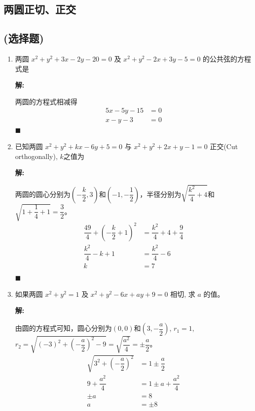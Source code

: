 \documentclass[10pt]{article}
\newcommand{\sol}{\textbf{解:} }
\begin{document}
\subsection{两圆正切、正交}
\subsection*{(选择题)}

\begin{enumerate}[leftmargin=*]
  \item 两圆 $x^{2}+y^{2}+3 x-2 y-20=0$ 及 $x^{2}+y^{2}-2 x+3 y-5=0$ 的公共弦的方程式是

        \sol{}

        两圆的方程式相减得
        \begin{align*}
          5x - 5y - 15 & = 0 \\
          x - y - 3    & = 0
        \end{align*} \hfill$\blacksquare$

  \item 已知两圆 $x^{2}+y^{2}+k x-6 y+5=0$ 与 $x^{2}+y^{2}+2 x+y-1=0$ 正交(Cut orthogonally), $k$之值为

        \sol{}

        两圆的圆心分别为$\left(-\dfrac{k}{2}, 3\right)$和$\left(-1, -\dfrac{1}{2}\right)$，半径分别为$\sqrt{\dfrac{k^2}{4} + 4}$和$\sqrt{1 + \dfrac{1}{4} + 1} = \dfrac{3}{2}$。
        \begin{align*}
          \dfrac{49}{4}+\left(-\dfrac{k}{2} + 1\right)^{2} & = \dfrac{k^2}{4} + 4 + \dfrac{9}{4} \\
          \dfrac{k^2}{4} - k + 1                           & = \dfrac{k^2}{4} - 6                \\
          k                                                & = 7                                 \\
        \end{align*} \hfill$\blacksquare$

  \item 如果两圆 $x^{2}+y^{2}=1$ 及 $x^{2}+y^{2}-6 x+a y+9=0$ 相切, 求 $a$ 的值。

        \sol{}

        由圆的方程式可知，圆心分别为$(0, 0)$和$\left(3, -\dfrac{a}{2}\right)$, $r_1 = 1$, $r_2 = \sqrt{(-3)^2 + \left(-\dfrac{a}{2}\right)^2 - 9} = \sqrt{\dfrac{a^2}{4}} = \pm\dfrac{a}{2}$。
        \begin{align*}
          \sqrt{3^2 + \left(-\dfrac{a}{2}\right)^2} & = 1 \pm \dfrac{a}{2}       \\
          9 + \dfrac{a^2}{4}                        & = 1 \pm a + \dfrac{a^2}{4} \\
          \pm a                                     & = 8                        \\
          a                                         & = \pm 8
        \end{align*}


\end{enumerate}
\end{document}
